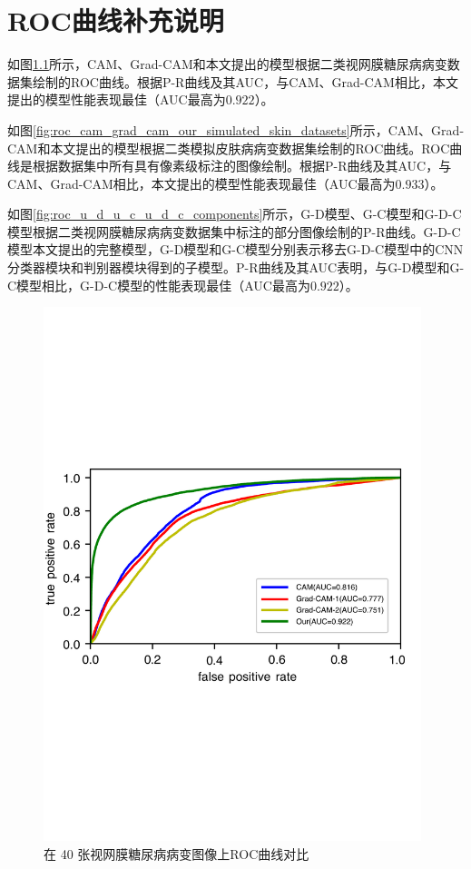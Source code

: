 \chapter{ROC曲线补充说明}\label{chapter:append1}
如图\ref{fig:roc_cam_grad_cam_our_diabetic_retinopathy}所示，CAM、Grad-CAM和本文提出的模型根据二类视网膜糖尿病病变数据集绘制的ROC曲线。根据P-R曲线及其AUC，与CAM、Grad-CAM相比，本文提出的模型性能表现最佳（AUC最高为$0.922$）。

如图\ref{fig:roc_cam_grad_cam_our_simulated_skin_datasets}所示，CAM、Grad-CAM和本文提出的模型根据二类模拟皮肤病病变数据集绘制的ROC曲线。ROC曲线是根据数据集中所有具有像素级标注的图像绘制。根据P-R曲线及其AUC，与CAM、Grad-CAM相比，本文提出的模型性能表现最佳（AUC最高为$0.933$）。

如图\ref{fig:roc_u_d_u_c_u_d_c_components}所示，G-D模型、G-C模型和G-D-C模型根据二类视网膜糖尿病病变数据集中标注的部分图像绘制的P-R曲线。G-D-C模型本文提出的完整模型，G-D模型和G-C模型分别表示移去G-D-C模型中的CNN分类器模块和判别器模块得到的子模型。P-R曲线及其AUC表明，与G-D模型和G-C模型相比，G-D-C模型的性能表现最佳（AUC最高为$0.922$）。
\begin{figure}[H]
	\centering
	\includegraphics[width=0.98\textwidth]{figure/ROC_cam_grad_cam_our_diabetic_retinopathy}
	\caption{在 40 张视网膜糖尿病病变图像上ROC曲线对比}
	\label{fig:roc_cam_grad_cam_our_diabetic_retinopathy}
\end{figure}
